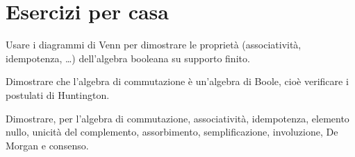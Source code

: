 \documentclass[11pt,a4paper]{article}
\begin{document}
\section*{Esercizi per casa}

\begin{esercizio}
Usare i diagrammi di Venn per dimostrare le proprietà (associatività,
idempotenza, \dots) dell'algebra booleana su supporto finito.
\end{esercizio}
\begin{esercizio}
Dimostrare che l'algebra di commutazione è un'algebra di Boole, cioè verificare
i postulati di Huntington.
\end{esercizio}
\begin{esercizio}
Dimostrare, per l'algebra di commutazione, associatività, idempotenza, elemento
nullo, unicità del complemento, assorbimento, semplificazione, involuzione, De
Morgan e consenso.
\end{esercizio}
\end{document}
